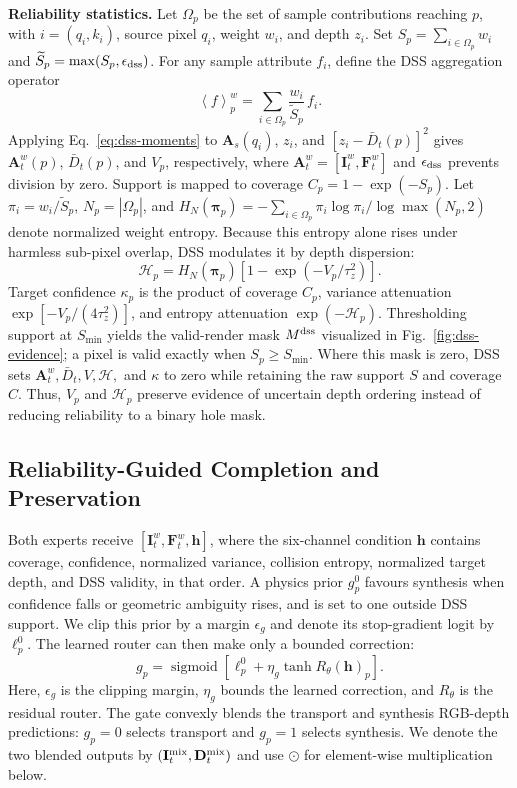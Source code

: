\documentclass[letterpaper,10pt,conference]{ieeeconf}
\newcommand{\I}{\mathbf{I}}
\newcommand{\D}{\mathbf{D}}
\newcommand{\F}{\mathbf{F}}
\newcommand{\od}{\mathbin{\odot}}
\begin{document}
\noindent\textbf{Reliability statistics.}
Let $\Omega_p$ be the set of sample contributions reaching $p$, with
$i=(q_i,k_i)$, source pixel $q_i$, weight $w_i$, and depth $z_i$. Set
$S_p=\sum_{i\in\Omega_p}w_i$ and
$\widetilde S_p=\max(S_p,\epsilon_{\rm dss})$. For any sample attribute $f_i$,
define the DSS aggregation operator
\begin{equation}
 \left\langle f\right\rangle_p^w
 =\sum_{i\in\Omega_p}\frac{w_i}{\widetilde S_p}\,f_i.
\label{eq:dss-moments}
\end{equation}
Applying Eq.~\eqref{eq:dss-moments} to $\mathbf A_s(q_i)$, $z_i$, and
$[z_i-\bar D_t(p)]^2$ gives $\mathbf A_t^w(p)$, $\bar D_t(p)$, and $V_p$,
respectively, where $\mathbf A_t^w=[\I_t^w,\F_t^w]$ and
$\epsilon_{\rm dss}$ prevents division by zero. Support is mapped to coverage
$C_p=1-\exp(-S_p)$. Let $\pi_i=w_i/\widetilde S_p$, $N_p=|\Omega_p|$, and
$H_N(\boldsymbol\pi_p)=-\sum_{i\in\Omega_p}\pi_i\log\pi_i/
\log\max(N_p,2)$ denote normalized weight entropy. Because this entropy alone
rises under harmless sub-pixel overlap, DSS modulates it by depth dispersion:
\begin{equation}
 \mathcal H_p=H_N(\boldsymbol\pi_p)
 \left[1-\exp(-V_p/\tau_z^2)\right].
\label{eq:collision-entropy}
\end{equation}
Target confidence $\kappa_p$ is the product of coverage $C_p$, variance
attenuation $\exp[-V_p/(4\tau_z^2)]$, and entropy attenuation
$\exp(-\mathcal H_p)$. Thresholding support at $S_{\min}$ yields the
valid-render mask $M^{\rm dss}$ visualized in Fig.~\ref{fig:dss-evidence}; a
pixel is valid exactly when $S_p\geq S_{\min}$. Where this mask is zero, DSS
sets $\mathbf A_t^w,\bar D_t,V,\mathcal H,$ and $\kappa$ to zero while
retaining the raw support $S$ and coverage $C$. Thus, $V_p$ and
$\mathcal H_p$ preserve evidence of uncertain depth ordering instead of
reducing reliability to a binary hole mask.

\subsection{Reliability-Guided Completion and Preservation}

Both experts receive $[\I_t^w,\F_t^w,\mathbf h]$, where the six-channel
condition $\mathbf h$ contains coverage, confidence, normalized variance,
collision entropy, normalized target depth, and DSS validity, in that order.
A physics prior $g_p^0$ favours synthesis when confidence falls or geometric
ambiguity rises, and is set to one outside DSS support. We clip this prior by
a margin $\epsilon_g$ and denote its stop-gradient logit by $\ell_p^0$. The
learned router can then make only a bounded correction:
\begin{equation}
 g_p=\operatorname{sigmoid}\!\left[
 \ell_p^0+\eta_g\tanh R_\theta(\mathbf h)_p\right].
\label{eq:router}
\end{equation}
Here, $\epsilon_g$ is the clipping margin, $\eta_g$ bounds the learned
correction, and $R_\theta$ is the residual router. The gate convexly blends
the transport and synthesis RGB-depth predictions: $g_p=0$ selects transport
and $g_p=1$ selects synthesis. We denote the two blended outputs by
$(\I_t^{\rm mix},\D_t^{\rm mix})$ and use $\od$ for element-wise
multiplication below.
\end{document}
